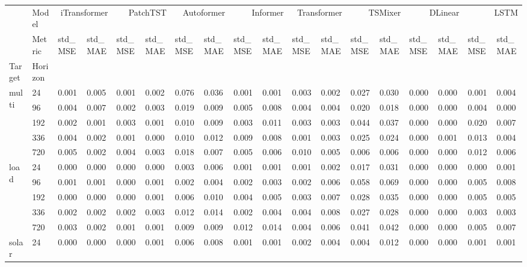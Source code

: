 \begin{tabular}{llllllllllllllllll}
\toprule
 & Model & \multicolumn{2}{r}{iTransformer} & \multicolumn{2}{r}{PatchTST} & \multicolumn{2}{r}{Autoformer} & \multicolumn{2}{r}{Informer} & \multicolumn{2}{r}{Transformer} & \multicolumn{2}{r}{TSMixer} & \multicolumn{2}{r}{DLinear} & \multicolumn{2}{r}{LSTM} \\
 & Metric & std_MSE & std_MAE & std_MSE & std_MAE & std_MSE & std_MAE & std_MSE & std_MAE & std_MSE & std_MAE & std_MSE & std_MAE & std_MSE & std_MAE & std_MSE & std_MAE \\
Target & Horizon &  &  &  &  &  &  &  &  &  &  &  &  &  &  &  &  \\
\midrule
\multirow[t]{5}{*}{multi} & 24 & 0.001 & 0.005 & 0.001 & 0.002 & 0.076 & 0.036 & 0.001 & 0.001 & 0.003 & 0.002 & 0.027 & 0.030 & 0.000 & 0.000 & 0.001 & 0.004 \\
 & 96 & 0.004 & 0.007 & 0.002 & 0.003 & 0.019 & 0.009 & 0.005 & 0.008 & 0.004 & 0.004 & 0.020 & 0.018 & 0.000 & 0.000 & 0.004 & 0.000 \\
 & 192 & 0.002 & 0.001 & 0.003 & 0.001 & 0.010 & 0.009 & 0.003 & 0.011 & 0.003 & 0.003 & 0.044 & 0.037 & 0.000 & 0.000 & 0.020 & 0.007 \\
 & 336 & 0.004 & 0.002 & 0.001 & 0.000 & 0.010 & 0.012 & 0.009 & 0.008 & 0.001 & 0.003 & 0.025 & 0.024 & 0.000 & 0.001 & 0.013 & 0.004 \\
 & 720 & 0.005 & 0.002 & 0.004 & 0.003 & 0.018 & 0.007 & 0.005 & 0.006 & 0.010 & 0.005 & 0.006 & 0.006 & 0.000 & 0.000 & 0.012 & 0.006 \\
\cline{1-18}
\multirow[t]{5}{*}{load} & 24 & 0.000 & 0.000 & 0.000 & 0.000 & 0.003 & 0.006 & 0.001 & 0.001 & 0.001 & 0.002 & 0.017 & 0.031 & 0.000 & 0.000 & 0.000 & 0.001 \\
 & 96 & 0.001 & 0.001 & 0.000 & 0.001 & 0.002 & 0.004 & 0.002 & 0.003 & 0.002 & 0.006 & 0.058 & 0.069 & 0.000 & 0.000 & 0.005 & 0.008 \\
 & 192 & 0.000 & 0.000 & 0.000 & 0.001 & 0.006 & 0.010 & 0.004 & 0.005 & 0.003 & 0.007 & 0.028 & 0.035 & 0.000 & 0.000 & 0.005 & 0.005 \\
 & 336 & 0.002 & 0.002 & 0.002 & 0.003 & 0.012 & 0.014 & 0.002 & 0.004 & 0.004 & 0.008 & 0.027 & 0.028 & 0.000 & 0.000 & 0.003 & 0.003 \\
 & 720 & 0.003 & 0.002 & 0.001 & 0.001 & 0.009 & 0.009 & 0.012 & 0.014 & 0.004 & 0.006 & 0.041 & 0.042 & 0.000 & 0.000 & 0.005 & 0.007 \\
\cline{1-18}
\multirow[t]{5}{*}{solar} & 24 & 0.000 & 0.000 & 0.000 & 0.001 & 0.006 & 0.008 & 0.001 & 0.001 & 0.002 & 0.004 & 0.004 & 0.012 & 0.000 & 0.000 & 0.001 & 0.001 \\

\end{tabular}
